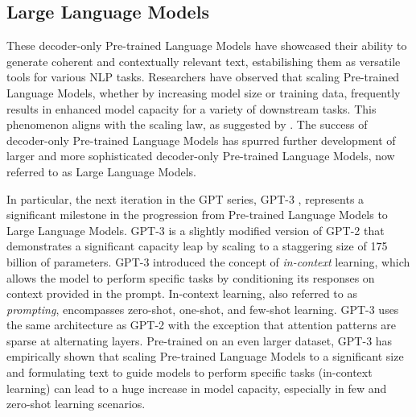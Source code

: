 

\subsection{Large Language Models}

These decoder-only Pre-trained Language Models have showcased their ability to generate coherent and contextually relevant text, estabilishing them as versatile tools for various \ac{NLP} tasks. Researchers have observed that scaling Pre-trained Language Models, whether by increasing model size or training data, frequently results in enhanced model capacity for a variety of downstream tasks. This phenomenon aligns with the scaling law, as suggested by \citet{kaplan2020scaling}. The success of decoder-only Pre-trained Language Models has spurred further development of larger and more sophisticated decoder-only Pre-trained Language Models, now referred to as Large Language Models.

In particular, the next iteration in the \ac{GPT} series, \ac{GPT}-3 \citep{brown2020language}, represents a significant milestone in the progression from Pre-trained Language Models to Large Language Models. \ac{GPT}-3 is a slightly modified version of \ac{GPT}-2 that demonstrates a significant capacity leap by scaling to a staggering size of 175 billion of parameters. \ac{GPT}-3 introduced the concept of \textit{in-context} learning, which allows the model to perform specific tasks by conditioning its responses on context provided in the prompt. In-context learning, also referred to as \textit{prompting}, encompasses zero-shot, one-shot, and few-shot learning. \ac{GPT}-3 uses the same architecture as \ac{GPT}-2 with the exception that attention patterns are sparse at alternating layers. Pre-trained on an even larger dataset, \ac{GPT}-3 has empirically shown that scaling Pre-trained Language Models to a significant size and formulating text to guide models to perform specific tasks (in-context learning) can lead to a huge increase in model capacity, especially in few and zero-shot learning scenarios.



